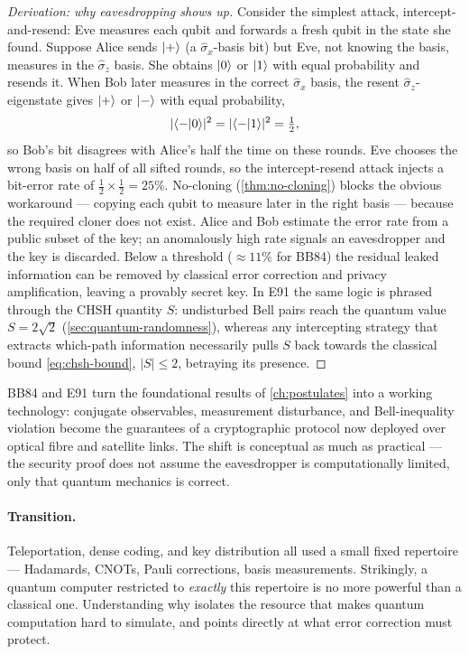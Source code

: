 \begin{proof}[Derivation: why eavesdropping shows up]
Consider the simplest attack, intercept-and-resend: Eve measures each
qubit and forwards a fresh qubit in the state she found. Suppose Alice
sends $\ket{+}$ (a $\hat\sigma_x$-basis bit) but Eve, not knowing the
basis, measures in the $\hat\sigma_z$ basis. She obtains $\ket{0}$ or
$\ket{1}$ with equal probability and resends it. When Bob later measures
in the correct $\hat\sigma_x$ basis, the resent
$\hat\sigma_z$-eigenstate gives $\ket{+}$ or $\ket{-}$ with equal
probability,
\begin{equation}
|\!\braket{-}{0}\!|^2=|\!\braket{-}{1}\!|^2=\tfrac12,
\end{equation}
so Bob's bit disagrees with Alice's half the time on these rounds. Eve
chooses the wrong basis on half of all sifted rounds, so the
intercept-resend attack injects a bit-error rate of
$\tfrac12\times\tfrac12=25\%$. No-cloning (\cref{thm:no-cloning}) blocks
the obvious workaround --- copying each qubit to measure later in the
right basis --- because the required cloner does not exist. Alice and
Bob estimate the error rate from a public subset of the key; an
anomalously high rate signals an eavesdropper and the key is discarded.
Below a threshold ($\approx 11\%$ for BB84) the residual leaked
information can be removed by classical error correction and privacy
amplification, leaving a provably secret key. In E91 the same logic is
phrased through the CHSH quantity $S$: undisturbed Bell pairs reach the
quantum value $S=2\sqrt2$ (\cref{sec:quantum-randomness}), whereas any
intercepting strategy that extracts which-path information necessarily
pulls $S$ back towards the classical bound \cref{eq:chsh-bound},
$|S|\le2$, betraying its presence.
\end{proof}

\begin{application}
\label{app:qkd}
BB84 and E91 turn the foundational results of \cref{ch:postulates}
into a working technology: conjugate observables, measurement
disturbance, and Bell-inequality violation become the guarantees of a
cryptographic protocol now deployed over optical fibre and
satellite links. The shift is conceptual as much as practical --- the
security proof does not assume the eavesdropper is computationally
limited, only that quantum mechanics is correct.
\end{application}

\paragraph{Transition.}
Teleportation, dense coding, and key distribution all used a small fixed
repertoire --- Hadamards, CNOTs, Pauli corrections, basis measurements.
Strikingly, a quantum computer restricted to \emph{exactly} this
repertoire is no more powerful than a classical one. Understanding why
isolates the resource that makes quantum computation hard to simulate,
and points directly at what error correction must protect.

